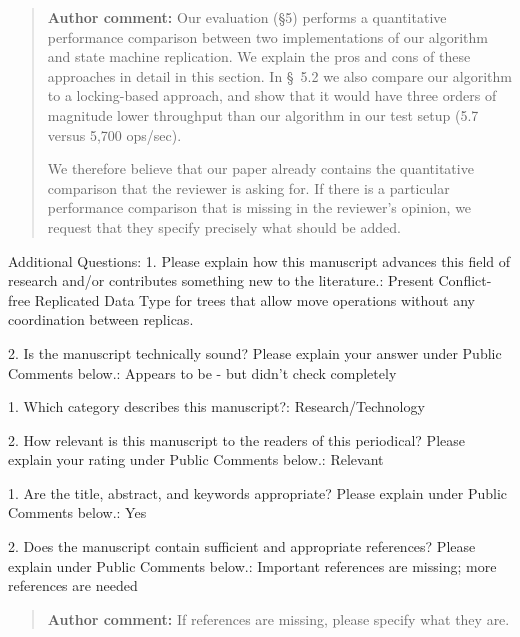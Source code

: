 \documentclass[10pt]{article}
\newcommand{\authorcomment}[1]{\begin{quote}\textbf{Author comment:} #1\end{quote}}
\begin{document}
\authorcomment{Our evaluation ({\S}5) performs a quantitative performance comparison between two implementations of our algorithm and state machine replication.
We explain the pros and cons of these approaches in detail in this section.
In \S~5.2 we also compare our algorithm to a locking-based approach, and show that it would have three orders of magnitude lower throughput than our algorithm in our test setup (5.7 versus 5,700 ops/sec).

We therefore believe that our paper already contains the quantitative comparison that the reviewer is asking for.
If there is a particular performance comparison that is missing in the reviewer's opinion, we request that they specify precisely what should be added.}
\begin{spverbatim}

Additional Questions:
1.  Please explain how this manuscript advances this field of research and/or contributes something new to the literature.: Present Conflict-free Replicated Data Type for trees that allow move operations without any coordination between replicas.

2. Is the manuscript technically sound? Please explain your answer under Public Comments below.: Appears to be - but didn't check completely

1. Which category describes this manuscript?: Research/Technology

2. How relevant is this manuscript to the readers of this periodical? Please explain your rating under Public Comments below.: Relevant

1. Are the title, abstract, and keywords appropriate? Please explain under Public Comments below.: Yes

2. Does the manuscript contain sufficient and appropriate references? Please explain under Public Comments below.: Important references are missing; more references are needed
\end{spverbatim}
\authorcomment{If references are missing, please specify what they are.}
\end{document}
